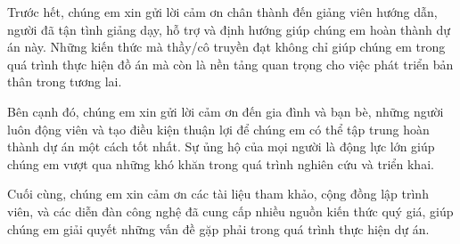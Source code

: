 

\vspace{0.5cm} %

Trước hết, chúng em xin gửi lời cảm ơn chân thành đến giảng viên hướng dẫn, người đã tận tình giảng dạy, hỗ trợ và định hướng giúp chúng em hoàn thành dự án này. Những kiến thức mà thầy/cô truyền đạt không chỉ giúp chúng em trong quá trình thực hiện đồ án mà còn là nền tảng quan trọng cho việc phát triển bản thân trong tương lai.

Bên cạnh đó, chúng em xin gửi lời cảm ơn đến gia đình và bạn bè, những người luôn động viên và tạo điều kiện thuận lợi để chúng em có thể tập trung hoàn thành dự án một cách tốt nhất. Sự ủng hộ của mọi người là động lực lớn giúp chúng em vượt qua những khó khăn trong quá trình nghiên cứu và triển khai.

Cuối cùng, chúng em xin cảm ơn các tài liệu tham khảo, cộng đồng lập trình viên, và các diễn đàn công nghệ đã cung cấp nhiều nguồn kiến thức quý giá, giúp chúng em giải quyết những vấn đề gặp phải trong quá trình thực hiện dự án.\\ \\